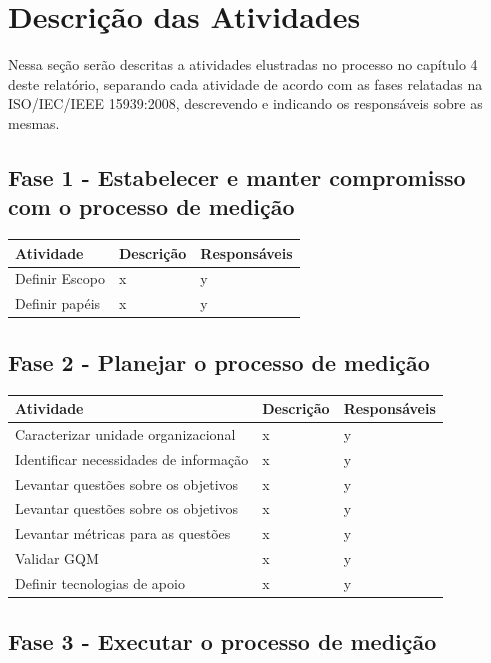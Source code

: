 \section{Descrição das Atividades}

Nessa seção serão descritas a atividades elustradas no processo no capítulo 4 deste relatório, separando cada atividade de acordo com as fases relatadas na ISO/IEC/IEEE 15939:2008, descrevendo e indicando os responsáveis sobre as mesmas.

\subsection{Fase 1 - Estabelecer e manter compromisso com o processo de medição}
	\begin{tabular}{ |p{4cm}|p{6cm}| p{3cm} |}
	 \hline
	 Atividade 		& 		Descrição & Responsáveis \\
	 \hline
	 	Definir Escopo & x &  y \\
	 \hline
	 	Definir papéis & x &  y \\
	 \hline
	\end{tabular}


\subsection{Fase 2 - Planejar o processo de medição}

	\begin{tabular}{ |p{4cm}|p{6cm}| p{3cm} |}
	 \hline
	 Atividade 		& 		Descrição & Responsáveis \\
	 \hline
	 	Caracterizar unidade organizacional & x &  y \\
	 \hline
	 	Identificar necessidades de informação & x &  y \\
	 \hline
	 	Levantar questões sobre os objetivos & x &  y \\
	 \hline
	 	Levantar questões sobre os objetivos & x &  y \\
	 \hline
	 Levantar métricas para as questões & x &  y \\
	 \hline
	 Validar GQM & x &  y \\
	 \hline
	 Definir tecnologias de apoio & x &  y \\
	 \hline
	\end{tabular}

\subsection{Fase 3 - Executar o processo de medição}

